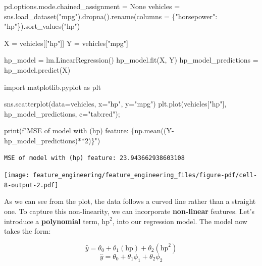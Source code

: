\documentclass[
  letterpaper,
  DIV=11,
  numbers=noendperiod]{scrreprt}
\newenvironment{Shaded}{\begin{snugshade}}{\end{snugshade}}
\newcommand{\BuiltInTok}[1]{\textcolor[rgb]{0.00,0.23,0.31}{#1}}
\newcommand{\DecValTok}[1]{\textcolor[rgb]{0.68,0.00,0.00}{#1}}
\newcommand{\ImportTok}[1]{\textcolor[rgb]{0.00,0.46,0.62}{#1}}
\newcommand{\NormalTok}[1]{\textcolor[rgb]{0.00,0.23,0.31}{#1}}
\newcommand{\OperatorTok}[1]{\textcolor[rgb]{0.37,0.37,0.37}{#1}}
\newcommand{\SpecialCharTok}[1]{\textcolor[rgb]{0.37,0.37,0.37}{#1}}
\newcommand{\SpecialStringTok}[1]{\textcolor[rgb]{0.13,0.47,0.30}{#1}}
\newcommand{\StringTok}[1]{\textcolor[rgb]{0.13,0.47,0.30}{#1}}
\newcommand{\VariableTok}[1]{\textcolor[rgb]{0.07,0.07,0.07}{#1}}
\begin{document}
\begin{Shaded}
\begin{Highlighting}[]
\NormalTok{pd.options.mode.chained\_assignment }\OperatorTok{=} \VariableTok{None} 
\NormalTok{vehicles }\OperatorTok{=}\NormalTok{ sns.load\_dataset(}\StringTok{"mpg"}\NormalTok{).dropna().rename(columns }\OperatorTok{=}\NormalTok{ \{}\StringTok{"horsepower"}\NormalTok{: }\StringTok{"hp"}\NormalTok{\}).sort\_values(}\StringTok{"hp"}\NormalTok{)}

\NormalTok{X }\OperatorTok{=}\NormalTok{ vehicles[[}\StringTok{"hp"}\NormalTok{]]}
\NormalTok{Y }\OperatorTok{=}\NormalTok{ vehicles[}\StringTok{"mpg"}\NormalTok{]}

\NormalTok{hp\_model }\OperatorTok{=}\NormalTok{ lm.LinearRegression()}
\NormalTok{hp\_model.fit(X, Y)}
\NormalTok{hp\_model\_predictions }\OperatorTok{=}\NormalTok{ hp\_model.predict(X)}

\ImportTok{import}\NormalTok{ matplotlib.pyplot }\ImportTok{as}\NormalTok{ plt}

\NormalTok{sns.scatterplot(data}\OperatorTok{=}\NormalTok{vehicles, x}\OperatorTok{=}\StringTok{"hp"}\NormalTok{, y}\OperatorTok{=}\StringTok{"mpg"}\NormalTok{)}
\NormalTok{plt.plot(vehicles[}\StringTok{"hp"}\NormalTok{], hp\_model\_predictions, c}\OperatorTok{=}\StringTok{"tab:red"}\NormalTok{)}\OperatorTok{;}

\BuiltInTok{print}\NormalTok{(}\SpecialStringTok{f"MSE of model with (hp) feature: }\SpecialCharTok{\{}\NormalTok{np}\SpecialCharTok{.}\NormalTok{mean((Y}\OperatorTok{{-}}\NormalTok{hp\_model\_predictions)}\OperatorTok{**}\DecValTok{2}\NormalTok{)}\SpecialCharTok{\}}\SpecialStringTok{"}\NormalTok{)}
\end{Highlighting}
\end{Shaded}

\begin{verbatim}
MSE of model with (hp) feature: 23.943662938603108
\end{verbatim}

\texttt{[image: feature\_engineering/feature\_engineering\_files/figure-pdf/cell-8-output-2.pdf]}

As we can see from the plot, the data follows a curved line rather than
a straight one. To capture this non-linearity, we can incorporate
\textbf{non-linear} features. Let's introduce a \textbf{polynomial}
term, \(\text{hp}^2\), into our regression model. The model now takes
the form:

\[\hat{y} = \theta_0 + \theta_1 (\text{hp}) + \theta_2 (\text{hp}^2)\]
\[\hat{y} = \theta_0 + \theta_1 \phi_1 + \theta_2 \phi_2\]
\end{document}
